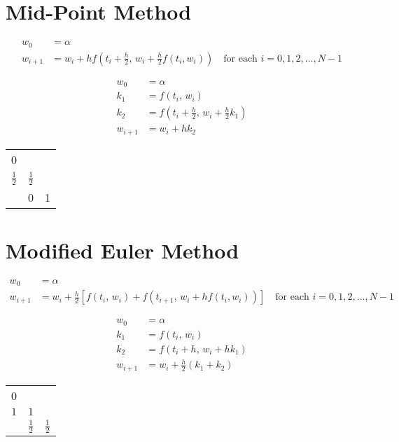 \documentclass[../main-sheet.tex]{subfiles}
\begin{document}
\section{Mid-Point Method}
\begin{align*}
    w_0&=\alpha\\
    w_{i+1}&=w_i+h f\left( t_i+\frac{h}{2},\,w_i+\frac{h}{2}f(t_i,w_i) \right) \quad \text{for each } i=0,1,2,\dots,N-1
\end{align*}
\begin{center}
    \begin{minipage}[c]{.4\textwidth}
        \begin{align*}
            w_0&=\alpha\\
            k_1&=f(t_i,\,w_i)\\
            k_2&=f\left(t_i+\frac{h}{2},\,w_i+\frac{h}{2}k_1\right)\\
            w_{i+1}&=w_i+hk_2
        \end{align*}
    \end{minipage}
    \begin{minipage}[c]{.4\textwidth}
        \centering
        \begin{tabular}{c|cc}
            0 & & \\[.5 em]
            \(\frac{1}{2}\) & \(\frac{1}{2}\) & \\[.5 em]
            \hline
            \Tstrut & 0 & 1 \\
        \end{tabular}
    \end{minipage}
\end{center}
\section{Modified Euler Method}
\begin{align*}
    w_0&=\alpha\\
    w_{i+1}&=w_i+\frac{h}{2} \left[ f(t_i,\,w_i)+f(t_{i+1},\,w_i+hf(t_i,w_i)) \right] \quad \text{for each } i=0,1,2,\dots,N-1
\end{align*}
\begin{center}
    \begin{minipage}[c]{.4\textwidth}
        \begin{align*}
            w_0&=\alpha\\
            k_1&=f(t_i,\,w_i)\\
            k_2&=f\left(t_i+h,\,w_i+hk_1\right)\\
            w_{i+1}&=w_i+\frac{h}{2}\left( k_1+k_2 \right)
        \end{align*}
    \end{minipage}
    \begin{minipage}[c]{.4\textwidth}
        \centering
        \begin{tabular}{c|cc}
            0 & & \\[.5 em]
            \(1\) & \(1\) & \\
            \hline
            \Tstrut & \(\frac{1}{2}\) & \(\frac{1}{2}\) \\
        \end{tabular}
    \end{minipage}
\end{center}
\end{document}
